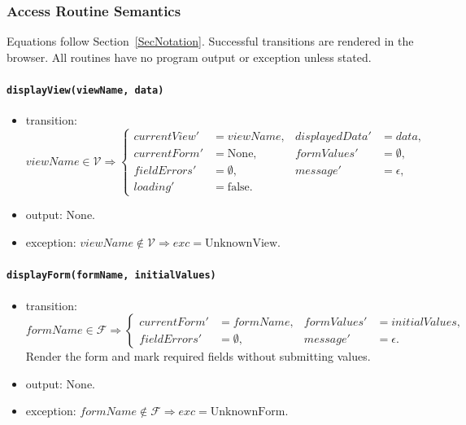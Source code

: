 \documentclass[12pt, titlepage]{article}
\begin{document}
\subsubsection{Access Routine Semantics}

Equations follow Section~\ref{SecNotation}. Successful transitions are rendered in the browser. All routines have no program output or exception unless stated.

\paragraph{\texttt{displayView(viewName, data)}}
\begin{itemize}
  \item transition:
  \[
  viewName\in\mathcal{V}\Rightarrow
  \left\{
  \begin{aligned}
    \mathit{currentView}' &= viewName, & \mathit{displayedData}' &= data,\\
    \mathit{currentForm}' &= \text{None}, & \mathit{formValues}' &= \emptyset,\\
    \mathit{fieldErrors}' &= \emptyset, & \mathit{message}' &= \epsilon,\\
    \mathit{loading}' &= \text{false}. &&
  \end{aligned}
  \right.
  \]
  \item output: None.
  \item exception:
  $viewName\notin\mathcal{V}\Rightarrow exc=\text{UnknownView}$.
\end{itemize}

\paragraph{\texttt{displayForm(formName, initialValues)}}
\begin{itemize}
  \item transition:
  \[
  formName\in\mathcal{F}\Rightarrow
  \left\{
  \begin{aligned}
    \mathit{currentForm}' &= formName, & \mathit{formValues}' &= initialValues,\\
    \mathit{fieldErrors}' &= \emptyset, & \mathit{message}' &= \epsilon.
  \end{aligned}
  \right.
  \]
  Render the form and mark required fields without submitting values.
  \item output: None.
  \item exception:
  $formName\notin\mathcal{F}\Rightarrow exc=\text{UnknownForm}$.
\end{itemize}
\end{document}
